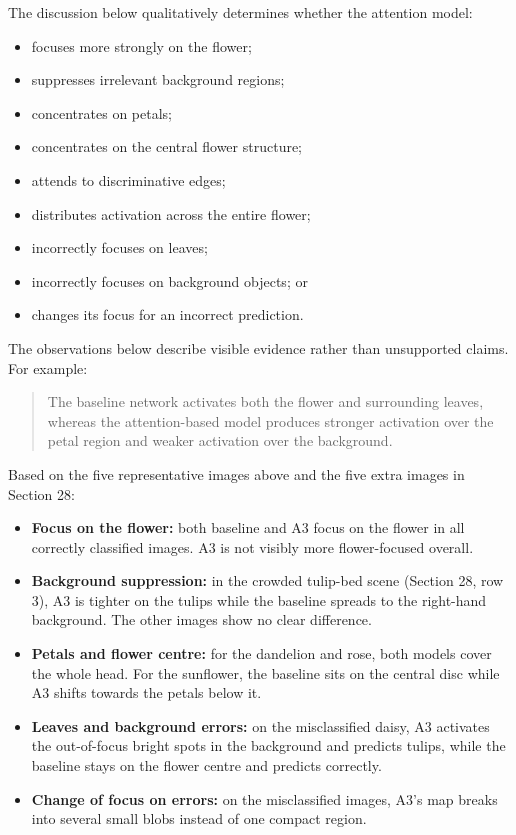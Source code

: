 \documentclass[10pt]{article}
\begin{document}
The discussion below qualitatively determines whether the attention model:

\begin{itemize}

\item focuses more strongly on the flower;

\item suppresses irrelevant background regions;

\item concentrates on petals;

\item concentrates on the central flower structure;

\item attends to discriminative edges;

\item distributes activation across the entire flower;

\item incorrectly focuses on leaves;

\item incorrectly focuses on background objects; or

\item changes its focus for an incorrect prediction.

\end{itemize}

The observations below describe visible evidence rather than unsupported
claims. For example:

\begin{quote}
The baseline network activates both the flower and surrounding leaves,
whereas the attention-based model produces stronger activation over the petal
region and weaker activation over the background.
\end{quote}

Based on the five representative images above and the five extra images in
Section 28:
\begin{itemize}
\item \textbf{Focus on the flower:} both baseline and A3 focus on the flower in
all correctly classified images. A3 is not visibly more flower-focused overall.
\item \textbf{Background suppression:} in the crowded tulip-bed scene (Section 28,
row 3), A3 is tighter on the tulips while the baseline spreads to the right-hand
background. The other images show no clear difference.
\item \textbf{Petals and flower centre:} for the dandelion and rose, both models
cover the whole head. For the sunflower, the baseline sits on the central disc
while A3 shifts towards the petals below it.
\item \textbf{Leaves and background errors:} on the misclassified daisy, A3
activates the out-of-focus bright spots in the background and predicts tulips,
while the baseline stays on the flower centre and predicts correctly.
\item \textbf{Change of focus on errors:} on the misclassified images, A3's map
breaks into several small blobs instead of one compact region.
\end{itemize}
\end{document}
